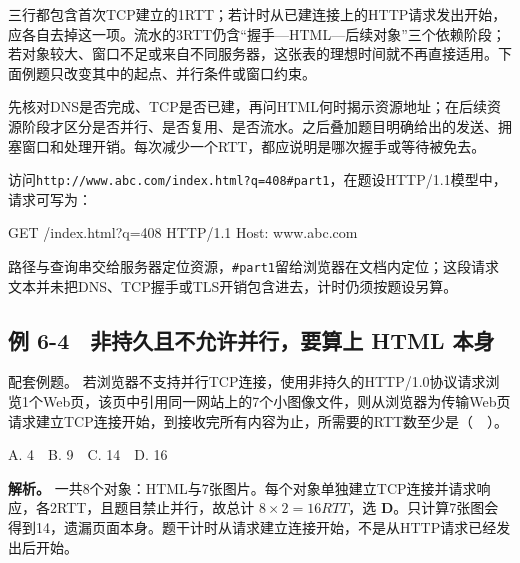 三行都包含首次TCP建立的1RTT；若计时从已建连接上的HTTP请求发出开始，应各自去掉这一项。流水的3RTT仍含``握手---HTML---后续对象''三个依赖阶段；若对象较大、窗口不足或来自不同服务器，这张表的理想时间就不再直接适用。下面例题只改变其中的起点、并行条件或窗口约束。

\begin{methodbox}[HTTP时延按依赖分段]

先核对DNS是否完成、TCP是否已建，再问HTML何时揭示资源地址；在后续资源阶段才区分是否并行、是否复用、是否流水。之后叠加题目明确给出的发送、拥塞窗口和处理开销。每次减少一个RTT，都应说明是哪次握手或等待被免去。

\end{methodbox}

\begin{example}[请求目标不包含片段标识]

访问\texttt{http:\allowbreak{}/\allowbreak{}/\allowbreak{}www.abc.com/\allowbreak{}index.html?q=\allowbreak{}408\#part1}，在题设HTTP/1.1模型中，请求可写为：

\begin{codeblock}[language={}]
GET /index.html?q=408 HTTP/1.1
Host: www.abc.com
\end{codeblock}

\end{example}

路径与查询串交给服务器定位资源，\texttt{\#part1}留给浏览器在文档内定位；这段请求文本并未把DNS、TCP握手或TLS开销包含进去，计时仍须按题设另算。

\subsection{例 6-4　非持久且不允许并行，要算上 HTML 本身}\label{CN06-ex4}

\begin{example}[配套例题]

配套例题。 若浏览器不支持并行TCP连接，使用非持久的HTTP/1.0协议请求浏览1个Web页，该页中引用同一网站上的7个小图像文件，则从浏览器为传输Web页请求建立TCP连接开始，到接收完所有内容为止，所需要的RTT数至少是（　）。

A. 4　B. 9　C. 14　D. 16

\end{example}

\textbf{解析。} 一共8个对象：HTML与7张图片。每个对象单独建立TCP连接并请求响应，各2RTT，且题目禁止并行，故总计 \(8\times2=16RTT\)，选 \textbf{D}。只计算7张图会得到14，遗漏页面本身。题干计时从请求建立连接开始，不是从HTTP请求已经发出后开始。

